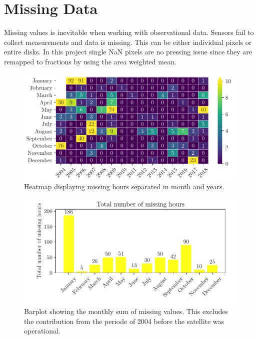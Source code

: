 \section{Missing Data} \label{sec:missing_values}
Missing values is inevitable when working with observational data. Sensors fail to collect measurements and data is missing. This can be either individual pixels or entire disks. In this project single NaN pixels are no pressing issue since they are remapped to fractions by using the area weighted mean. 
\begin{figure}
    \centering
    \includegraphics[scale = 1.0]{python_figs/heatmap_missing_values.pdf}
    \caption[Heatmap showing missing hours for all months or years.]{Heatmap displaying missing hours separated in month and years.}
    \label{fig:heatmap_missing_values}
\end{figure}
\begin{figure}
    \centering
    \includegraphics[scale = 1.0]{python_figs/heatmap_missing_values_monthly_sum.pdf}
    \caption{Barplot showing the monthly sum of missing values. This excludes the contribution from the periode of 2004 before the satellite was operational.}
    \label{fig:barplot_missing_values}
\end{figure}

